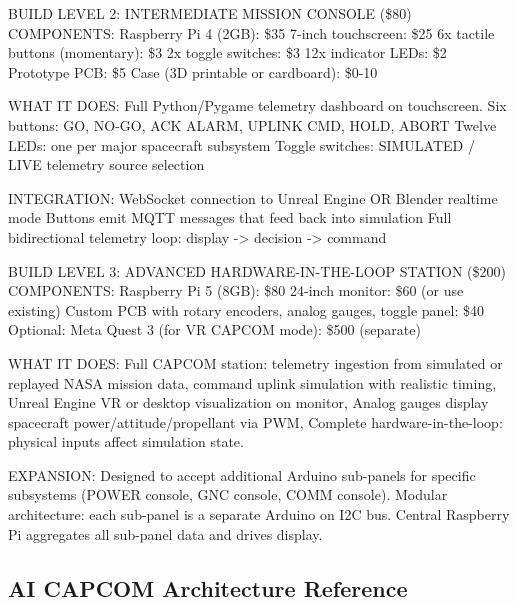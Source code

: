 \documentclass[11pt,letterpaper]{article}
\begin{document}
\begin{hwbox}{BUILD LEVEL 2: INTERMEDIATE MISSION CONSOLE (\$80)}
COMPONENTS:
  Raspberry Pi 4 (2GB): \$35
  7-inch touchscreen: \$25
  6x tactile buttons (momentary): \$3
  2x toggle switches: \$3
  12x indicator LEDs: \$2
  Prototype PCB: \$5
  Case (3D printable or cardboard): \$0-10

WHAT IT DOES:
  Full Python/Pygame telemetry dashboard on touchscreen.
  Six buttons: GO, NO-GO, ACK ALARM, UPLINK CMD, HOLD, ABORT
  Twelve LEDs: one per major spacecraft subsystem
  Toggle switches: SIMULATED / LIVE telemetry source selection

INTEGRATION:
  WebSocket connection to Unreal Engine OR Blender realtime mode
  Buttons emit MQTT messages that feed back into simulation
  Full bidirectional telemetry loop: display -> decision -> command
\end{hwbox}

\begin{hwbox}{BUILD LEVEL 3: ADVANCED HARDWARE-IN-THE-LOOP STATION (\$200)}
COMPONENTS:
  Raspberry Pi 5 (8GB): \$80
  24-inch monitor: \$60 (or use existing)
  Custom PCB with rotary encoders, analog gauges, toggle panel: \$40
  Optional: Meta Quest 3 (for VR CAPCOM mode): \$500 (separate)

WHAT IT DOES:
  Full CAPCOM station: telemetry ingestion from simulated or replayed
  NASA mission data, command uplink simulation with realistic timing,
  Unreal Engine VR or desktop visualization on monitor,
  Analog gauges display spacecraft power/attitude/propellant via PWM,
  Complete hardware-in-the-loop: physical inputs affect simulation state.

EXPANSION:
  Designed to accept additional Arduino sub-panels for specific
  subsystems (POWER console, GNC console, COMM console).
  Modular architecture: each sub-panel is a separate Arduino on I2C bus.
  Central Raspberry Pi aggregates all sub-panel data and drives display.
\end{hwbox}

\subsection{AI CAPCOM Architecture Reference}
\end{document}
